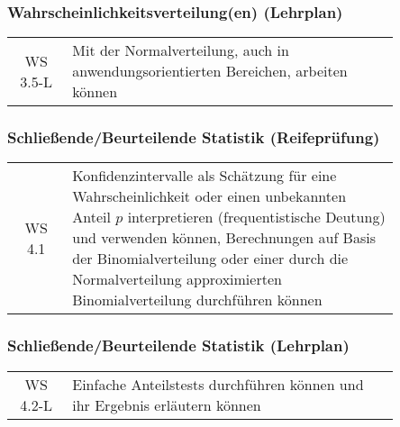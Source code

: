 \documentclass[a4paper,12pt]{article}
\begin{document}
\subsubsection{Wahrscheinlichkeitsverteilung(en) (Lehrplan)}
\begin{em}
\begin{tabular}{cp{0.85\linewidth}}
WS 3.5-L & Mit der Normalverteilung, auch in anwendungsorientierten Bereichen, arbeiten können\\
\end{tabular}
\end{em}


\subsubsection{Schließende/Beurteilende Statistik (Reifeprüfung)}

\begin{tabular}{cp{0.85\linewidth}}
WS 4.1 & Konfidenzintervalle als Schätzung für eine Wahrscheinlichkeit oder einen unbekannten Anteil $p$ interpretieren (frequentistische Deutung) und verwenden können, Berechnungen auf Basis der Binomialverteilung oder einer durch die Normalverteilung approximierten Binomialverteilung durchführen können\\
\end{tabular}

\subsubsection{Schließende/Beurteilende Statistik (Lehrplan)}
\begin{em}
\begin{tabular}{cp{0.85\linewidth}}
WS 4.2-L & Einfache Anteilstests durchführen können und ihr Ergebnis erläutern können\\
\end{tabular}
\end{em}
\end{document}
